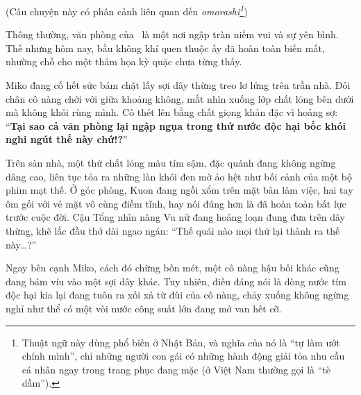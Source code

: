 \documentclass[../main.tex]{subfiles}
\begin{document}

\begin{center}
  (Câu chuyện này có phân cảnh liên quan đến \textit{omorashi\footnote{Thuật ngữ này dùng phổ biến ở Nhật Bản, và nghĩa của nó là ``tự làm ướt chính mình'', chỉ những người con gái có những hành động giải tỏa nhu cầu cá nhân ngay trong trang phục đang mặc (ở Việt Nam thường gọi là ``tè dầm'').}})
\end{center}

Thông thường, văn phòng của \hll\ là một nơi ngập tràn niềm vui và sự yên bình. Thế nhưng hôm nay, bầu không khí quen thuộc ấy đã hoàn toàn biến mất, nhường chỗ cho một thảm họa kỳ quặc chưa từng thấy.

Miko đang cố hết sức bám chặt lấy sợi dây thừng treo lơ lửng trên trần nhà. Đôi chân cô nàng chới với giữa khoảng không, mắt nhìn xuống lớp chất lỏng bên dưới mà không khỏi rùng mình. Cô thét lên bằng chất giọng khản đặc vì hoảng sợ: ``\textbf{Tại sao cả văn phòng lại ngập ngụa trong thứ nước độc hại bốc khói nghi ngút thế này chứ!?}''


Trên sàn nhà, một thứ chất lỏng màu tím sậm, đặc quánh đang không ngừng dâng cao, liên tục tỏa ra những làn khói đen mờ ảo hệt như bối cảnh của một bộ phim mạt thế. Ở góc phòng, Kuon đang ngồi xổm trên mặt bàn làm việc, hai tay ôm gối với vẻ mặt vô cùng điềm tĩnh, hay nói đúng hơn là đã hoàn toàn bất lực trước cuộc đời. Cậu Tổng nhìn nàng Vu nữ đang hoảng loạn đung đưa trên dây thừng, khẽ lắc đầu thở dài ngao ngán: ``Thế quái nào mọi thứ lại thành ra thế này\dots?''

Ngay bên cạnh Miko, cách đó chừng bốn mét, một cô nàng hậu bối khác cũng đang bám víu vào một sợi dây khác. Tuy nhiên, điều đáng nói là dòng nước tím độc hại kia lại đang tuôn ra xối xả từ đùi của cô nàng, chảy xuống không ngừng nghỉ như thể có một vòi nước công suất lớn đang mở van hết cỡ.
\end{document}
